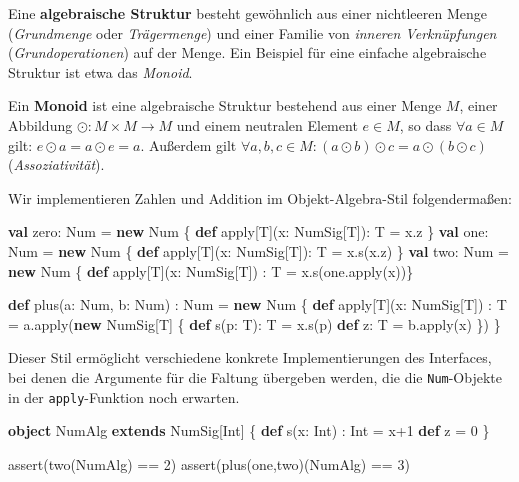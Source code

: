 \documentclass[]{article}
\newenvironment{Shaded}{}{}
\newcommand{\DecValTok}[1]{\textcolor[rgb]{0.25,0.63,0.44}{#1}}
\newcommand{\FunctionTok}[1]{\textcolor[rgb]{0.02,0.16,0.49}{#1}}
\newcommand{\KeywordTok}[1]{\textcolor[rgb]{0.00,0.44,0.13}{\textbf{#1}}}
\newcommand{\NormalTok}[1]{#1}
\begin{document}
Eine \textbf{algebraische Struktur} besteht gewöhnlich aus einer
nichtleeren Menge (\emph{Grundmenge} oder \emph{Trägermenge}) und einer
Familie von \emph{inneren Verknüpfungen} (\emph{Grundoperationen}) auf
der Menge. Ein Beispiel für eine einfache algebraische Struktur ist etwa
das \emph{Monoid}.

Ein \textbf{Monoid} ist eine algebraische Struktur bestehend aus einer
Menge \(M\), einer Abbildung \(\odot: M \times M \to M\) und einem
neutralen Element \(e \in M\), so dass \(\forall a \in M\) gilt:
\(e \odot a = a \odot e = a\). Außerdem gilt
\(\forall a,b,c \in M: (a \odot b) \odot c = a \odot (b \odot c)\)
(\emph{Assoziativität}).

Wir implementieren Zahlen und Addition im Objekt-Algebra-Stil
folgendermaßen:

\begin{Shaded}
\begin{Highlighting}[]
\KeywordTok{val}\NormalTok{ zero: Num = }\KeywordTok{new}\NormalTok{ Num \{ }\KeywordTok{def}\NormalTok{ apply[T](x: NumSig[T]): T = x.}\FunctionTok{z}\NormalTok{ \}}
\KeywordTok{val}\NormalTok{ one: Num = }\KeywordTok{new}\NormalTok{ Num \{ }\KeywordTok{def}\NormalTok{ apply[T](x: NumSig[T]): T = x.}\FunctionTok{s}\NormalTok{(x.}\FunctionTok{z}\NormalTok{) \}}
\KeywordTok{val}\NormalTok{ two: Num = }\KeywordTok{new}\NormalTok{ Num \{ }\KeywordTok{def}\NormalTok{ apply[T](x: NumSig[T]) : T = x.}\FunctionTok{s}\NormalTok{(one.}\FunctionTok{apply}\NormalTok{(x))\}}

\KeywordTok{def} \FunctionTok{plus}\NormalTok{(a: Num, b: Num) : Num = }\KeywordTok{new}\NormalTok{ Num \{}
  \KeywordTok{def}\NormalTok{ apply[T](x: NumSig[T]) : T = a.}\FunctionTok{apply}\NormalTok{(}\KeywordTok{new}\NormalTok{ NumSig[T] \{}
    \KeywordTok{def} \FunctionTok{s}\NormalTok{(p: T): T = x.}\FunctionTok{s}\NormalTok{(p)}
    \KeywordTok{def}\NormalTok{ z: T = b.}\FunctionTok{apply}\NormalTok{(x)}
\NormalTok{  \})}
\NormalTok{\}}
\end{Highlighting}
\end{Shaded}

Dieser Stil ermöglicht verschiedene konkrete Implementierungen des
Interfaces, bei denen die Argumente für die Faltung übergeben werden,
die die \texttt{Num}-Objekte in der \texttt{apply}-Funktion noch
erwarten.

\begin{Shaded}
\begin{Highlighting}[]
\KeywordTok{object}\NormalTok{ NumAlg }\KeywordTok{extends}\NormalTok{ NumSig[Int] \{}
  \KeywordTok{def} \FunctionTok{s}\NormalTok{(x: Int) : Int = x+}\DecValTok{1}
  \KeywordTok{def}\NormalTok{ z = }\DecValTok{0}
\NormalTok{\}}

\FunctionTok{assert}\NormalTok{(}\FunctionTok{two}\NormalTok{(NumAlg) == }\DecValTok{2}\NormalTok{)}
\FunctionTok{assert}\NormalTok{(}\FunctionTok{plus}\NormalTok{(one,two)(NumAlg) == }\DecValTok{3}\NormalTok{)}
\end{Highlighting}
\end{Shaded}
\end{document}
